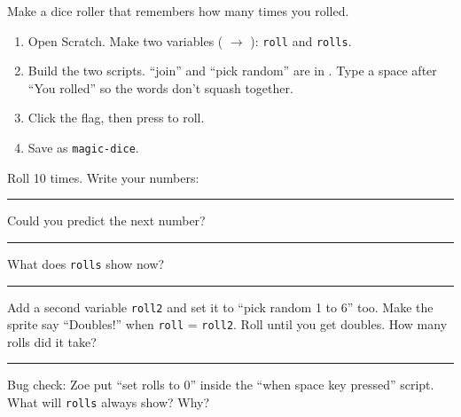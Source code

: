 \namedateline

\begin{core}
Make a dice roller that remembers how many times you rolled.
\begin{enumerate}[leftmargin=1.4em,itemsep=1pt]
  \item Open Scratch. Make two variables ( $\rightarrow$ ): \texttt{roll} and \texttt{rolls}.
  \item Build the two scripts. \enquote{join} and \enquote{pick random} are in . Type a space after \enquote{You rolled} so the words don't squash together.
  \item Click the flag, then press  to roll.
  \item Save as \texttt{magic-dice}.
\end{enumerate}
\begin{center}
\begin{scratch}[scale=0.78]
\end{scratch}
\hspace{0.5cm}
\begin{scratch}[scale=0.78]
\end{scratch}
\end{center}
Roll 10 times. Write your numbers: \rule{8cm}{0.4pt}

Could you predict the next number? \rule{4cm}{0.4pt}\quad What does \texttt{rolls} show now? \rule{2cm}{0.4pt}
\end{core}

\begin{challenge}[Doubles!]
Add a second variable \texttt{roll2} and set it to \enquote{pick random 1 to 6} too. Make the sprite say \enquote{Doubles!} when \texttt{roll} = \texttt{roll2}. Roll until you get doubles. How many rolls did it take? \rule{2cm}{0.4pt}

Bug check: Zoe put \enquote{set rolls to 0} inside the \enquote{when space key pressed} script. What will \texttt{rolls} always show? Why? 
\end{challenge}


